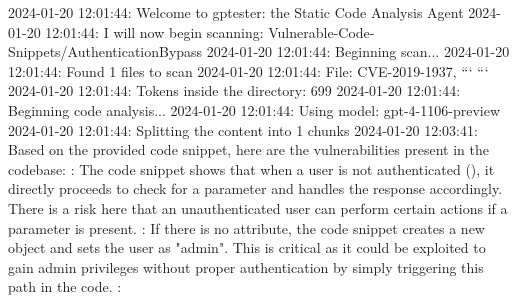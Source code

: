 \markdownRendererDocumentBegin
{}\markdownRendererInterblockSeparator
{}2024-01-20 12:01:44: Welcome to gptester: the Static Code Analysis Agent 2024-01-20 12:01:44: I will now begin scanning: Vulnerable-Code-Snippets/AuthenticationBypass 2024-01-20 12:01:44: Beginning scan... 2024-01-20 12:01:44: Found 1 files to scan 2024-01-20 12:01:44: File: CVE-2019-1937, ```\markdownRendererInterblockSeparator
{}\markdownRendererInterblockSeparator
{}``` 2024-01-20 12:01:44: Tokens inside the directory: 699 2024-01-20 12:01:44: Beginning code analysis... 2024-01-20 12:01:44: Using model: gpt-4-1106-preview 2024-01-20 12:01:44: Splitting the content into 1 chunks 2024-01-20 12:03:41: Based on the provided code snippet, here are the vulnerabilities present in the codebase:\markdownRendererInterblockSeparator
{}\markdownRendererOlBeginTight
{}:\markdownRendererOlItemEnd 
\markdownRendererOlEndTight \markdownRendererInterblockSeparator
{}\markdownRendererUlBeginTight
\markdownRendererUlItem The code snippet shows that when a user is not authenticated (), it directly proceeds to check for a  parameter and handles the response accordingly. There is a risk here that an unauthenticated user can perform certain actions if a  parameter is present.\markdownRendererUlItemEnd 
\markdownRendererUlEndTight \markdownRendererInterblockSeparator
{}\markdownRendererOlBeginTight
{}:\markdownRendererOlItemEnd 
\markdownRendererOlEndTight \markdownRendererInterblockSeparator
{}\markdownRendererUlBeginTight
\markdownRendererUlItem If there is no  attribute, the code snippet creates a new  object and sets the user as "admin". This is critical as it could be exploited to gain admin privileges without proper authentication by simply triggering this path in the code.\markdownRendererUlItemEnd 
\markdownRendererUlEndTight \markdownRendererInterblockSeparator
{}\markdownRendererOlBeginTight
{}:\markdownRendererOlItemEnd 

